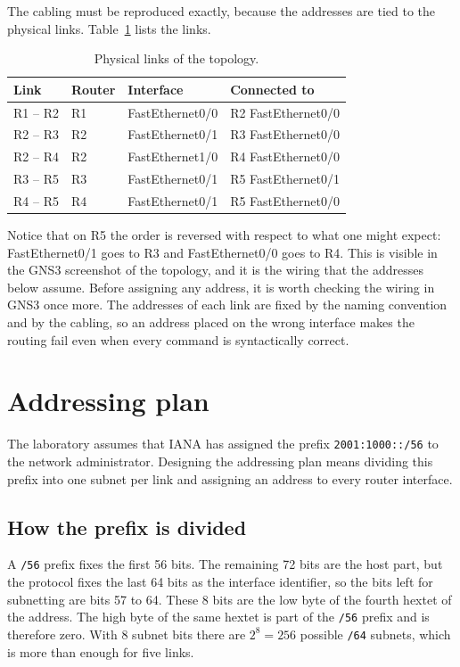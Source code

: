 The cabling must be reproduced exactly, because the addresses are tied to the physical links. Table~\ref{tab:lab01-cabling} lists the links.

\begin{table}[h]
\centering
\begin{tabular}{@{}llll@{}}
\toprule
\textbf{Link} & \textbf{Router} & \textbf{Interface} & \textbf{Connected to} \\
\midrule
R1 -- R2 & R1 & FastEthernet0/0 & R2 FastEthernet0/0 \\
R2 -- R3 & R2 & FastEthernet0/1 & R3 FastEthernet0/0 \\
R2 -- R4 & R2 & FastEthernet1/0 & R4 FastEthernet0/0 \\
R3 -- R5 & R3 & FastEthernet0/1 & R5 FastEthernet0/1 \\
R4 -- R5 & R4 & FastEthernet0/1 & R5 FastEthernet0/0 \\
\bottomrule
\end{tabular}
\caption{Physical links of the topology.}
\label{tab:lab01-cabling}
\end{table}

Notice that on R5 the order is reversed with respect to what one might expect: FastEthernet0/1 goes to R3 and FastEthernet0/0 goes to R4. This is visible in the GNS3 screenshot of the topology, and it is the wiring that the addresses below assume. Before assigning any address, it is worth checking the wiring in GNS3 once more. The addresses of each link are fixed by the naming convention and by the cabling, so an address placed on the wrong interface makes the routing fail even when every command is syntactically correct.

\section{Addressing plan}

The laboratory assumes that IANA has assigned the prefix \texttt{2001:1000::/56} to the network administrator. Designing the addressing plan means dividing this prefix into one subnet per link and assigning an address to every router interface.

\subsection{How the prefix is divided}

A \texttt{/56} prefix fixes the first 56 bits. The remaining 72 bits are the host part, but the protocol fixes the last 64 bits as the interface identifier, so the bits left for subnetting are bits 57 to 64. These 8 bits are the low byte of the fourth hextet of the address. The high byte of the same hextet is part of the \texttt{/56} prefix and is therefore zero. With 8 subnet bits there are $2^8 = 256$ possible \texttt{/64} subnets, which is more than enough for five links.

